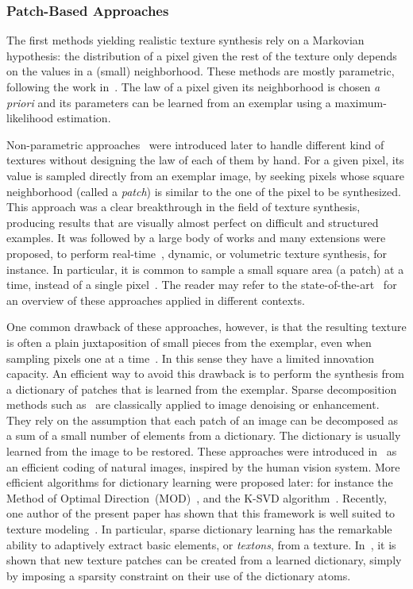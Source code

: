 \subsubsection{Patch-Based Approaches}

The first methods yielding realistic texture synthesis rely on a Markovian hypothesis: the distribution of a pixel given the rest of the texture only depends on the values in a (small) neighborhood.
These methods are mostly parametric, following the work in~\cite{cross1983markov}.
The law of a pixel given its neighborhood is chosen \emph{a priori} and its parameters can be learned from an exemplar using a maximum-likelihood estimation.

Non-parametric approaches~\cite{efros1999texture,wei2000fast} were introduced later to handle different kind of textures without designing the law of each of them by hand.
For a given pixel, its value is sampled directly from an exemplar image, by seeking pixels whose square neighborhood (called a {\it patch}) is similar to the one of the pixel to be synthesized.
This approach was a clear breakthrough in the field of texture synthesis, producing results that are visually almost perfect on difficult and structured examples.
It was followed by a large body of works and many extensions were proposed, to perform real-time~\cite{lefebvre2005parallel}, dynamic, or volumetric texture synthesis, for instance.
In particular, it is common to sample a small square area (a patch) at a time, instead of a single pixel~\cite{efros2001image}.
The reader may refer to the state-of-the-art~\cite{Wei2009} for an overview of these approaches applied in different contexts.

One common drawback of these approaches, however, is that the resulting texture is often a plain juxtaposition of small pieces from the exemplar, even when sampling pixels one at a time~\cite{aguerrebere2013exemplar}.
In this sense they have a limited innovation capacity.
An efficient way to avoid this drawback is to perform the synthesis from a dictionary of patches that is learned from the exemplar.
Sparse decomposition methods such as~\cite{elad2006image} are classically applied to image denoising or enhancement.
They rely on the assumption that each patch of an image can be decomposed as a sum of a small number of elements from a dictionary.
The dictionary is usually learned from the image to be restored.
These approaches were introduced in~\cite{olshausen1996natural} as an efficient coding of natural images, inspired by the human vision system.
More efficient algorithms for dictionary learning were proposed later: for instance the Method of Optimal Direction~(MOD)~\cite{engan1999method}, and the K-SVD algorithm~\cite{aharon2006ksvd}.
Recently, one author of the present paper has shown that this framework is well suited to texture modeling~\cite{peyre2009sparse}.
In particular, sparse dictionary learning has the remarkable ability to adaptively extract basic elements, or \emph{textons}, from a texture.
In~\cite{peyre2009sparse}, it is shown that new texture patches can be created from a learned dictionary, simply by imposing a sparsity constraint on their use of the dictionary atoms.



